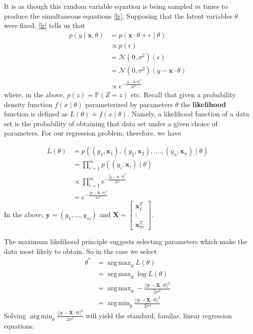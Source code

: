 \documentclass[12pt]{article}
\renewcommand{\P}{\mathbb{P}}
\newcommand{\x}{\mathbf{x}}
\newcommand{\norm}{\mathcal{N}}
\DeclareMathOperator*{\argmax}{arg\,max}
\DeclareMathOperator*{\argmin}{arg\,min}
\begin{document}
It is as though this random variable equation is being sampled $m$ times to produce the simultaneous equations \eqref{lr}.  Supposing that the latent variables $\theta$ were fixed, \eqref{lr} tells us that 
\begin{align*}
p(y \mid \x, \theta) &= p( \x \cdot \theta + \epsilon \mid \theta)\\
  &\propto p(\epsilon)\\
  &=\norm(0, \sigma^2)(\epsilon)\\
  &=\norm(0, \sigma^2)(y-\x \cdot \theta)\\
  &\propto e^{-\frac{|y - \x \cdot \theta|^2}{2\sigma^2}}
\end{align*}
where, in the above, $p(z) = \P(Z=z)$ etc. Recall that given a probability density function $f(x\mid \theta)$ parameterized by parameters $\theta$ the {\bf likelihood} function is defined as $L(\theta) \doteq f(x \mid \theta)$. Namely, a likelihood function of a data set is the probability of obtaining that data set under a given choice of parameters. For our regression problem, therefore, we have 

\begin{align*}
L(\theta) &= p((y_1, \x_1), (y_2, \x_2), ...., (y_n, \x_n) \mid  \theta)\\
&=\prod_{i=1}^m p((y_i, \x_i) \mid \theta)\\
&\propto \prod_{i=1}^m e^{-\frac{|y_i - \x_i \cdot \theta|^2}{2\sigma^2}}\\
&=  e^{-\frac{||\mathbf{y} - \mathbf{X} \cdot \theta||^2}{2\sigma^2}}
\end{align*}
In the above, $\mathbf{y} = (y_1, ..., y_m)$ and $\mathbf{X} = \begin{bmatrix} \x_1^ T \\ \vdots \\ \x_m^T \end{bmatrix}$. 

The maximum likelihood principle suggests selecting parameters which make the data most likely to obtain.  So in the case we select
\begin{align*} \theta^* &= \argmax_\theta L(\theta) \\
& = \argmax_\theta \log L(\theta)\\
& =  \argmax_\theta -\frac{||\mathbf{y} - \mathbf{X} \cdot \theta||^2}{2\sigma^2} \\
& =  \argmin_\theta \frac{||\mathbf{y} -  \mathbf{X} \cdot \theta||^2}{2\sigma^2}
\end{align*}
Solving $ \argmin_\theta \frac{||\mathbf{y} -  \mathbf{X} \cdot \theta||^2}{2\sigma^2}$ will yield the standard, familar, linear regression equations. 
\end{document}
